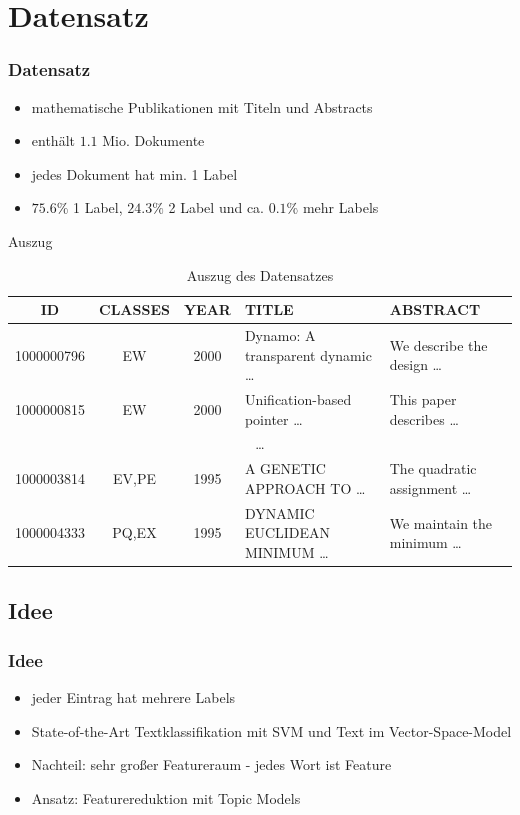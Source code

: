 \documentclass[12pt, xcolor=table]{beamer}
\begin{document}
\section{Datensatz}
\begin{frame}
    \frametitle{Datensatz}
    \begin{itemize}
        \item mathematische Publikationen mit Titeln und Abstracts
        \item enthält  $1.1$ Mio. Dokumente
        \item jedes Dokument hat min. 1 Label
        \item $75.6 \%$ 1 Label, $24.3 \%$ 2 Label und ca. $0.1 \%$ mehr Labels
    \end{itemize}
    \begin{block}{Auszug}
        \begin{table}
            \begin{tabular}{cccll}
                \tiny\textbf{ID} &\tiny \textbf{CLASSES} &\tiny \textbf{YEAR} &\tiny \textbf{TITLE} & \tiny \textbf{ABSTRACT} \\
                \hline
                \tiny 1000000796 &\tiny EW & \tiny 2000 & \tiny Dynamo: A transparent dynamic \dots  & \tiny We describe the design \dots \\
                \tiny 1000000815 &\tiny EW & \tiny 2000 & \tiny Unification-based pointer \dots  & \tiny This paper describes \dots \\
                \multicolumn{5}{c}{\dots} \\
                \tiny 1000003814 &\tiny EV,PE & \tiny 1995 & \tiny A GENETIC APPROACH TO \dots  & \tiny The quadratic assignment \dots \\
                \tiny 1000004333 & \tiny PQ,EX &\tiny 1995 &\tiny DYNAMIC EUCLIDEAN MINIMUM \dots & \tiny We maintain the minimum \dots \\
            \end{tabular}
             \caption*{Auszug des Datensatzes}
        \end{table}
    \end{block}
\end{frame}

\subsection{Idee} %
\begin{frame}
     \frametitle{Idee}
     \begin{itemize}
         \item jeder Eintrag hat mehrere Labels
         \item State-of-the-Art Textklassifikation mit SVM und Text im Vector-Space-Model
         \item Nachteil: sehr großer Featureraum - jedes Wort ist Feature
         \item Ansatz: Featurereduktion mit Topic Models
     \end{itemize}
\end{frame}
\end{document}
